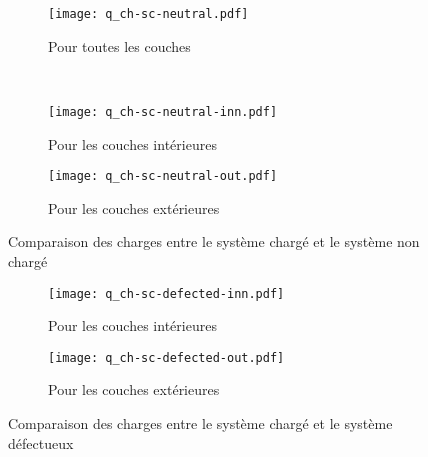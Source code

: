 \begin{figure}[h!]
    \centering
    \begin{subfigure}{.49 \textwidth}
        \centering
        \texttt{[image: q\_ch-sc-neutral.pdf]}
        \caption{Pour toutes les couches}
    \end{subfigure}%
    ~
    \begin{subfigure}{.49 \textwidth}
        \centering
        \texttt{[image: q\_ch-sc-neutral-inn.pdf]}
        \caption{Pour les couches intérieures}
    \end{subfigure}

    \begin{subfigure}{.49 \textwidth}
        \centering
        \texttt{[image: q\_ch-sc-neutral-out.pdf]}
        \caption{Pour les couches extérieures}
    \end{subfigure}
    \caption{Comparaison des charges entre le système chargé et le système non chargé}
    \label{fig:comparaison_ch-sc-neutral}
\end{figure}

\begin{figure}[h!]
    \centering
    \begin{subfigure}{.8 \textwidth}
        \centering
        \texttt{[image: q\_ch-sc-defected-inn.pdf]}
        \caption{Pour les couches intérieures}
    \end{subfigure}

    \begin{subfigure}{.8 \textwidth}
        \centering
        \texttt{[image: q\_ch-sc-defected-out.pdf]}
        \caption{Pour les couches extérieures}
    \end{subfigure}
    \caption{Comparaison des charges entre le système chargé et le système défectueux}
    \label{fig:comparaison_ch-sc-defected}
\end{figure}


